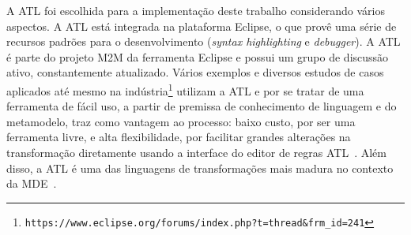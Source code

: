 A ATL foi escolhida para a implementação deste trabalho considerando vários aspectos. A ATL está integrada na plataforma Eclipse, o que provê uma série de recursos padrões para o desenvolvimento (\textit{syntax highlighting} e \textit{debugger}). A ATL é parte do projeto M2M da ferramenta Eclipse e possui um grupo de discussão ativo, constantemente atualizado. Vários exemplos e diversos estudos de casos aplicados até mesmo na indústria\footnote{\texttt{\texttt{https://www.eclipse.org/forums/index.php?t=thread&frm_id=241}}} utilizam a ATL e por se tratar de uma ferramenta de fácil uso, a partir de premissa de conhecimento de linguagem e do metamodelo, traz como vantagem ao processo: baixo custo, por ser uma ferramenta livre, e alta flexibilidade, por facilitar grandes alterações na transformação diretamente usando a interface do editor de regras ATL~\cite{Salem_2008}. Além disso, a ATL é uma das linguagens de transformações mais madura no contexto da MDE~\cite{bruneliere_2010}.




































